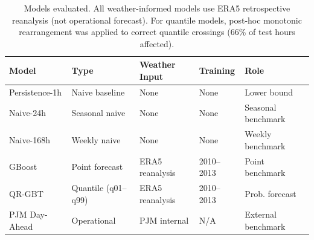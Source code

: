 \begin{table}[htbp]
\centering
\caption{Models evaluated. All weather-informed models use ERA5 retrospective reanalysis (not operational forecast). For quantile models, post-hoc monotonic rearrangement was applied to correct quantile crossings (66\% of test hours affected).}
\label{tab:model_summary}
\begin{tabular}{lllll}
\toprule
Model & Type & Weather Input & Training & Role \\
\midrule
Persistence-1h & Naive baseline & None & None & Lower bound \\
Naive-24h & Seasonal naive & None & None & Seasonal benchmark \\
Naive-168h & Weekly naive & None & None & Weekly benchmark \\
GBoost & Point forecast & ERA5 reanalysis & 2010--2013 & Point benchmark \\
QR-GBT & Quantile (q01--q99) & ERA5 reanalysis & 2010--2013 & Prob. forecast \\
PJM Day-Ahead & Operational & PJM internal & N/A & External benchmark \\
\bottomrule
\end{tabular}
\end{table}